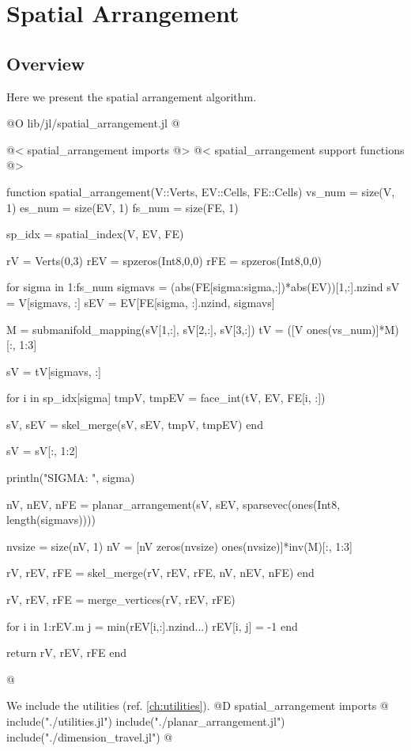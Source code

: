 \chapter{Spatial Arrangement}

\section{Overview}
Here we present the spatial arrangement algorithm. 

@O lib/jl/spatial_arrangement.jl
@{@< spatial\_arrangement imports @>
@< spatial\_arrangement support functions @>

function spatial_arrangement(V::Verts, EV::Cells, FE::Cells)
    vs_num = size(V, 1)
    es_num = size(EV, 1)
    fs_num = size(FE, 1)

    sp_idx = spatial_index(V, EV, FE)

    rV = Verts(0,3)
    rEV = spzeros(Int8,0,0)
    rFE = spzeros(Int8,0,0)

    for sigma in 1:fs_num
        sigmavs = (abs(FE[sigma:sigma,:])*abs(EV))[1,:].nzind 
        sV = V[sigmavs, :]
        sEV = EV[FE[sigma, :].nzind, sigmavs]


        M = submanifold_mapping(sV[1,:], sV[2,:], sV[3,:])
        tV = ([V ones(vs_num)]*M)[:, 1:3]

        sV = tV[sigmavs, :]

        for i in sp_idx[sigma]
            tmpV, tmpEV = face_int(tV, EV, FE[i, :])
            
            sV, sEV = skel_merge(sV, sEV, tmpV, tmpEV)
        end

        sV = sV[:, 1:2]

        println("SIGMA: ", sigma)
        
        nV, nEV, nFE = planar_arrangement(sV, sEV, sparsevec(ones(Int8, length(sigmavs))))

        nvsize = size(nV, 1)
        nV = [nV zeros(nvsize) ones(nvsize)]*inv(M)[:, 1:3]

        rV, rEV, rFE = skel_merge(rV, rEV, rFE, nV, nEV, nFE)
    end

    rV, rEV, rFE = merge_vertices(rV, rEV, rFE)
    
    for i in 1:rEV.m
        j = min(rEV[i,:].nzind...)
        rEV[i, j] = -1
    end

    return rV, rEV, rFE
end


@}
We include the utilities (ref. \ref{ch:utilities}).
@D spatial\_arrangement imports
@{
include("./utilities.jl")
include("./planar_arrangement.jl")
include("./dimension_travel.jl")
@}





